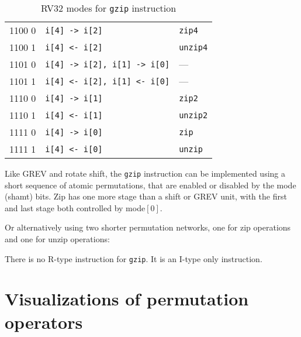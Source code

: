 \begin{table}[h]
\begin{small}
\begin{center}
\begin{tabular}{c l l}
\hline

      1100 0  & {\tt i[4] -> i[2]}               & {\tt zip4} \\
      1100 1  & {\tt i[4] <- i[2]}               & {\tt unzip4} \\
      1101 0  & {\tt i[4] -> i[2], i[1] -> i[0]} & --- \\
      1101 1  & {\tt i[4] <- i[2], i[1] <- i[0]} & --- \\
      1110 0  & {\tt i[4] -> i[1]}               & {\tt zip2} \\
      1110 1  & {\tt i[4] <- i[1]}               & {\tt unzip2} \\
      1111 0  & {\tt i[4] -> i[0]}               & {\tt zip} \\
      1111 1  & {\tt i[4] <- i[0]}               & {\tt unzip} \\
\end{tabular}
\end{center}
\end{small}
\caption{RV32 modes for {\tt gzip} instruction}
\label{gzip-modes}
\end{table}

Like GREV and rotate shift, the {\tt gzip} instruction can be implemented using a short
sequence of atomic permutations, that are enabled or disabled by the mode (shamt)
bits. Zip has one more stage than a shift or GREV unit, with the first and last stage
both controlled by mode$[0]$.



Or alternatively using two shorter permutation networks, one for zip operations
and one for unzip operations:



There is no R-type instruction for {\tt gzip}. It is an I-type only instruction.


\section{Visualizations of permutation operators}


